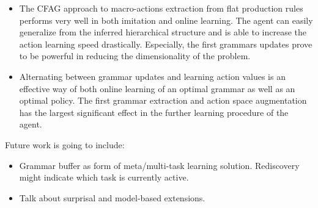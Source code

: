 \documentclass[colorinlistoftodos]{article}
\theoremstyle{definition}
\begin{document}
\begin{itemize}
	\item The CFAG approach to macro-actions extraction from flat production rules performs very well in both imitation and online learning. The agent can easily generalize from the inferred hierarchical structure and is able to increase the action learning speed drastically. Especially, the first grammars updates prove to be powerful in reducing the dimensionality of the problem.
	\item Alternating between grammar updates and learning action values is an effective way of both online learning of an optimal grammar as well as an optimal policy. The first grammar extraction and action space augmentation has the largest significant effect in the further learning procedure of the agent. 
\end{itemize} 

Future work is going to include:

\begin{itemize}
	\item Grammar buffer as form of meta/multi-task learning solution. Rediscovery might indicate which task is currently active.
	\item Talk about surprisal and model-based extensions.
\end{itemize}
\end{document}

